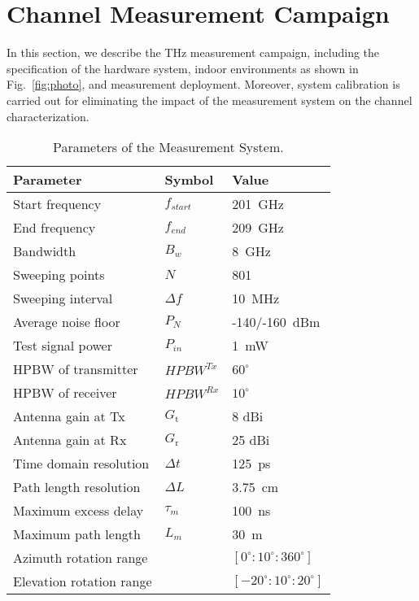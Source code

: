\documentclass[journal,12pt,draftclsnofoot,onecolumn]{IEEEtran}
\begin{document}
\section{Channel Measurement Campaign} \label{Sec:ChannelMeasurementCampaign}
In this section, we describe the THz measurement campaign, including the specification of the hardware system, indoor environments as shown in Fig.~\ref{fig:photo}, and measurement deployment. Moreover, system calibration is carried out for eliminating the impact of the measurement system on the channel characterization.
 

\begin{table}
  \centering
  \caption{Parameters of the Measurement System.}
    \begin{tabular}{lll}
        \toprule
    Parameter & \multicolumn{1}{l}{Symbol} & Value \\
    \midrule
    Start frequency &   $f_{start}$    & 201~GHz \\
    End frequency &   $f_{end}$    & 209~GHz \\

    Bandwidth &   $B_w$   & 8~GHz \\
    Sweeping points &   $ N$  & 801\\
    Sweeping interval &    $\Delta f$   & 10~MHz \\
    Average noise floor &  $P_N$     & -140/-160~dBm \\
    Test signal power &   $P_{in}$    & 1~mW \\
    HPBW of transmitter & $HPBW^{Tx}$     & $60^\circ$ \\
    HPBW of receiver &  $HPBW^{Rx}$  & $10^\circ$ \\
    Antenna gain at Tx &   $G_{\text{t}}$   & 8 dBi \\
    Antenna gain at Rx &   $G_{\text{r}}$   & 25 dBi \\
    Time domain resolution &  $\Delta t$     & 125~ps \\
    Path length resolution &   $\Delta L$    & 3.75~cm \\
    Maximum excess delay &    $\tau_m$   & 100~ns \\
    Maximum path length &   $L_m$    & 30~m \\
    Azimuth rotation range &      & $[0^\circ:10^\circ:360^\circ]$ \\
    Elevation rotation range &    & $[-20^\circ:10^\circ:20^\circ]$ \\
        \bottomrule
    \end{tabular}%
  \label{tab:mparameters}%
\end{table}%
\end{document}
